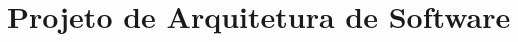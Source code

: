 \documentclass[11pt,a4paper]{article}
\begin{document}
 










\newpage
\section{Projeto de Arquitetura de Software}
\label{sec:pas}
\end{document}
